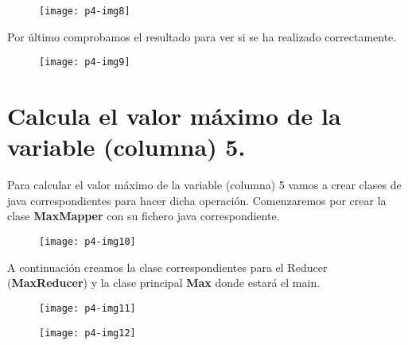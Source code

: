 \documentclass[10pt]{article}
\begin{document}
\begin{figure}[H]
	\begin{center}
 		\texttt{[image: p4-img8]}
	\end{center} 
\end{figure}

Por último comprobamos el resultado para ver si se ha realizado correctamente. \\

\begin{figure}[H]
	\begin{center}
 		\texttt{[image: p4-img9]}
	\end{center} 
\end{figure}


\section{Calcula el valor máximo de la variable (columna) 5.} 
Para calcular el valor máximo de la variable (columna) 5 vamos a crear clases de java correspondientes para hacer dicha operación. Comenzaremos por crear la clase \textbf{MaxMapper} con su fichero java correspondiente. \\

\begin{figure}[H]
	\begin{center}
 		\texttt{[image: p4-img10]}
	\end{center} 
\end{figure}

A continuación creamos la clase correspondientes para el Reducer (\textbf{MaxReducer}) y la clase principal \textbf{Max} donde estará el main. \\

\begin{figure}[H]
	\begin{center}
 		\texttt{[image: p4-img11]}
	\end{center} 
\end{figure}

\begin{figure}[H]
	\begin{center}
 		\texttt{[image: p4-img12]}
	\end{center} 
\end{figure}
\end{document}
